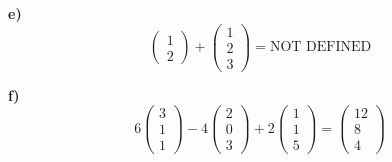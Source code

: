 \documentclass{subfiles}
\begin{document}
\noindent \textbf{e)}
\begin{equation*}
    \left(\begin{array}{ c }1 \\ 2 \end{array}\right) +
    \left(\begin{array}{ c }1 \\ 2 \\ 3 \end{array}\right) =
    \text{NOT DEFINED}
\end{equation*}

\noindent \textbf{f)}
\begin{equation*}
    6 \left(\begin{array}{ c }3 \\ 1 \\ 1\end{array}\right) -
    4 \left(\begin{array}{ c }2 \\ 0 \\ 3\end{array}\right) +
    2 \left(\begin{array}{ c }1 \\ 1 \\ 5\end{array}\right) =
    \left(\begin{array}{ c }12 \\ 8 \\ 4\end{array}\right)
\end{equation*}
\end{document}
